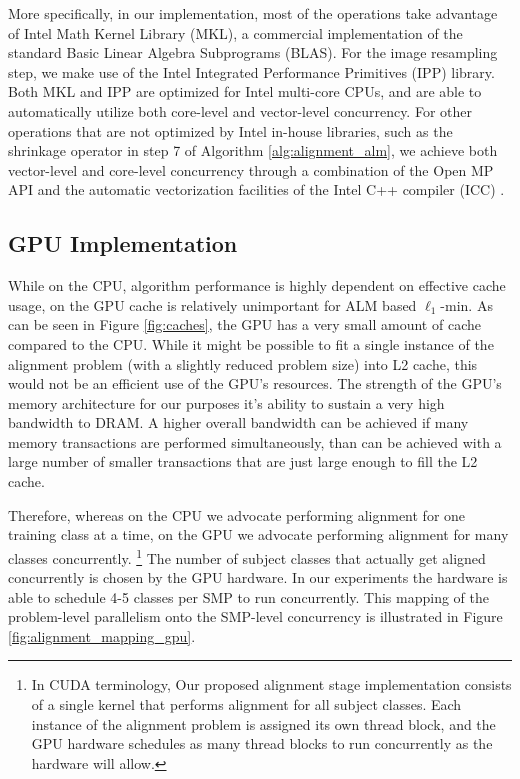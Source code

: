 \documentclass[10pt,twocolumn,letterpaper]{article}
\begin{document}
More specifically, in our implementation, most of the operations take
advantage of Intel Math Kernel Library (MKL), a commercial implementation of
the standard Basic Linear Algebra Subprograms (BLAS). For the image resampling
step, we make use of the Intel Integrated Performance Primitives (IPP) library.
Both MKL and IPP are optimized for Intel multi-core CPUs, and are able to
automatically utilize both core-level and vector-level concurrency. For other
operations that are not optimized by Intel in-house libraries, such as the shrinkage
operator in step 7 of Algorithm \ref{alg:alignment_alm}, we achieve both
vector-level and core-level concurrency through a combination of the Open MP
API \cite{dagum2002openmp} and the automatic vectorization facilities of the
Intel C++ compiler (ICC) \cite{dulong1999overview}. 

\subsection{GPU Implementation}
\label{sec:alignment_implementation_gpu}
While on the CPU, algorithm performance is highly dependent on effective
cache usage, on the GPU cache is relatively unimportant for ALM based
$\ell_1$-min.  As can be seen in Figure \ref{fig:caches}, the GPU has 
a very small amount of cache compared to the CPU.  While it might be possible
to fit a single instance of the alignment problem (with a slightly reduced problem size)
into L2 cache, this would not be an efficient use of the GPU's resources.
The strength of the GPU's memory architecture for our purposes it's ability to sustain a very
high bandwidth to DRAM.  A higher overall bandwidth can be achieved if 
many memory transactions are performed simultaneously, than can be achieved
with a large number of smaller transactions that are just large enough to fill
the L2 cache.

Therefore, whereas on the CPU we advocate performing alignment for one training
class at a time, on the GPU we advocate performing alignment for many classes
concurrently.  \footnote{In CUDA terminology, Our proposed alignment stage
implementation consists of a single kernel that performs alignment for all
subject classes.  Each instance of the alignment problem is assigned its own
thread block, and the GPU hardware schedules as many thread blocks to run
concurrently as the hardware will allow.} The number of subject classes that
actually get aligned concurrently is chosen by the GPU hardware. In our
experiments the hardware is able to schedule 4-5 classes per SMP to run
concurrently. This mapping of the problem-level parallelism onto the SMP-level
concurrency is illustrated in Figure \ref{fig:alignment_mapping_gpu}.
\end{document}

